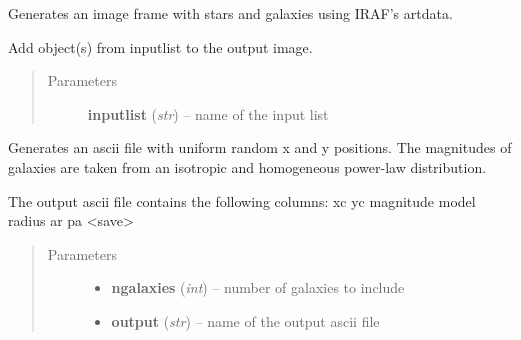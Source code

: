 \documentclass[a4paper,12pt,english]{sphinxmanual}
\begin{document}
\begin{fulllineitems}
\label{simulator:simulator.generateGalaxies.generateFakeData}
Generates an image frame with stars and galaxies using IRAF's artdata.

\begin{fulllineitems}
\label{simulator:simulator.generateGalaxies.generateFakeData.addObjects}
Add object(s) from inputlist to the output image.
\begin{quote}\begin{description}
\item[{Parameters}] \leavevmode
\textbf{inputlist} (\emph{str}) -- name of the input list

\end{description}\end{quote}

\end{fulllineitems}


\begin{fulllineitems}
\label{simulator:simulator.generateGalaxies.generateFakeData.createGalaxylist}
Generates an ascii file with uniform random x and y positions.
The magnitudes of galaxies are taken from an isotropic and homogeneous power-law distribution.

The output ascii file contains the following columns: xc yc magnitude model radius ar pa \textless{}save\textgreater{}
\begin{quote}\begin{description}
\item[{Parameters}] \leavevmode\begin{itemize}
\item {} 
\textbf{ngalaxies} (\emph{int}) -- number of galaxies to include

\item {} 
\textbf{output} (\emph{str}) -- name of the output ascii file

\end{itemize}


\end{description}
\end{quote}
\end{fulllineitems}
\end{fulllineitems}
\end{document}
